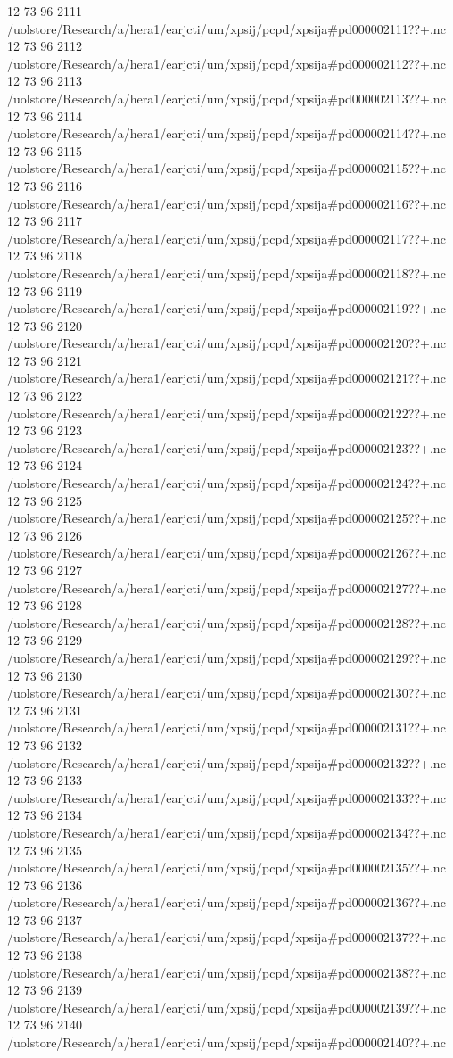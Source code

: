 12 73 96
2111
/uolstore/Research/a/hera1/earjcti/um/xpsij/pcpd/xpsija#pd000002111??+.nc
12 73 96
2112
/uolstore/Research/a/hera1/earjcti/um/xpsij/pcpd/xpsija#pd000002112??+.nc
12 73 96
2113
/uolstore/Research/a/hera1/earjcti/um/xpsij/pcpd/xpsija#pd000002113??+.nc
12 73 96
2114
/uolstore/Research/a/hera1/earjcti/um/xpsij/pcpd/xpsija#pd000002114??+.nc
12 73 96
2115
/uolstore/Research/a/hera1/earjcti/um/xpsij/pcpd/xpsija#pd000002115??+.nc
12 73 96
2116
/uolstore/Research/a/hera1/earjcti/um/xpsij/pcpd/xpsija#pd000002116??+.nc
12 73 96
2117
/uolstore/Research/a/hera1/earjcti/um/xpsij/pcpd/xpsija#pd000002117??+.nc
12 73 96
2118
/uolstore/Research/a/hera1/earjcti/um/xpsij/pcpd/xpsija#pd000002118??+.nc
12 73 96
2119
/uolstore/Research/a/hera1/earjcti/um/xpsij/pcpd/xpsija#pd000002119??+.nc
12 73 96
2120
/uolstore/Research/a/hera1/earjcti/um/xpsij/pcpd/xpsija#pd000002120??+.nc
12 73 96
2121
/uolstore/Research/a/hera1/earjcti/um/xpsij/pcpd/xpsija#pd000002121??+.nc
12 73 96
2122
/uolstore/Research/a/hera1/earjcti/um/xpsij/pcpd/xpsija#pd000002122??+.nc
12 73 96
2123
/uolstore/Research/a/hera1/earjcti/um/xpsij/pcpd/xpsija#pd000002123??+.nc
12 73 96
2124
/uolstore/Research/a/hera1/earjcti/um/xpsij/pcpd/xpsija#pd000002124??+.nc
12 73 96
2125
/uolstore/Research/a/hera1/earjcti/um/xpsij/pcpd/xpsija#pd000002125??+.nc
12 73 96
2126
/uolstore/Research/a/hera1/earjcti/um/xpsij/pcpd/xpsija#pd000002126??+.nc
12 73 96
2127
/uolstore/Research/a/hera1/earjcti/um/xpsij/pcpd/xpsija#pd000002127??+.nc
12 73 96
2128
/uolstore/Research/a/hera1/earjcti/um/xpsij/pcpd/xpsija#pd000002128??+.nc
12 73 96
2129
/uolstore/Research/a/hera1/earjcti/um/xpsij/pcpd/xpsija#pd000002129??+.nc
12 73 96
2130
/uolstore/Research/a/hera1/earjcti/um/xpsij/pcpd/xpsija#pd000002130??+.nc
12 73 96
2131
/uolstore/Research/a/hera1/earjcti/um/xpsij/pcpd/xpsija#pd000002131??+.nc
12 73 96
2132
/uolstore/Research/a/hera1/earjcti/um/xpsij/pcpd/xpsija#pd000002132??+.nc
12 73 96
2133
/uolstore/Research/a/hera1/earjcti/um/xpsij/pcpd/xpsija#pd000002133??+.nc
12 73 96
2134
/uolstore/Research/a/hera1/earjcti/um/xpsij/pcpd/xpsija#pd000002134??+.nc
12 73 96
2135
/uolstore/Research/a/hera1/earjcti/um/xpsij/pcpd/xpsija#pd000002135??+.nc
12 73 96
2136
/uolstore/Research/a/hera1/earjcti/um/xpsij/pcpd/xpsija#pd000002136??+.nc
12 73 96
2137
/uolstore/Research/a/hera1/earjcti/um/xpsij/pcpd/xpsija#pd000002137??+.nc
12 73 96
2138
/uolstore/Research/a/hera1/earjcti/um/xpsij/pcpd/xpsija#pd000002138??+.nc
12 73 96
2139
/uolstore/Research/a/hera1/earjcti/um/xpsij/pcpd/xpsija#pd000002139??+.nc
12 73 96
2140
/uolstore/Research/a/hera1/earjcti/um/xpsij/pcpd/xpsija#pd000002140??+.nc
